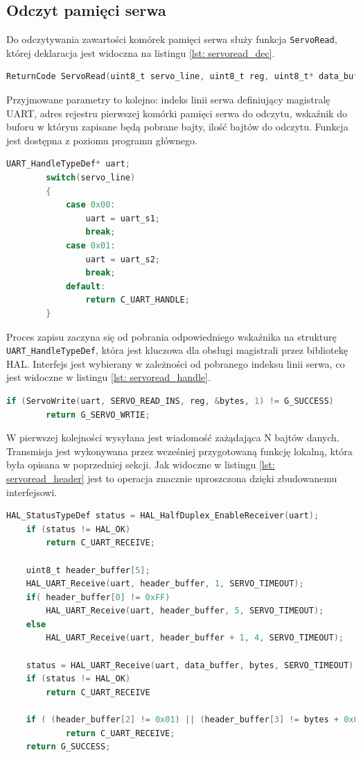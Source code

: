 \subsection{Odczyt pamięci serwa}
Do odczytywania zawartości komórek pamięci serwa służy funkcja \texttt{ServoRead}, której deklaracja jest widoczna na listingu \ref{lst: servoread_dec}.
\begin{lstlisting}[language=C,
caption={Deklaracja funkcji \texttt{ServoRead}},
label={lst: servoread_dec}]
    ReturnCode ServoRead(uint8_t servo_line, uint8_t reg, uint8_t* data_buffer, uint8_t bytes);
\end{lstlisting}
Przyjmowane parametry to kolejno: indeks linii serwa definiujący magistralę UART, adres rejestru pierwszej komórki pamięci serwa do odczytu, wskaźnik do buforu w którym zapisane będą pobrane bajty, ilość bajtów do odczytu. Funkcja jest dostępna z poziomu programu głównego.
\begin{lstlisting}[language=C,
caption={Początek funkcji \texttt{ServoRead}},
label={lst: servoread_handle}]
    UART_HandleTypeDef* uart;
        switch(servo_line)
        {
            case 0x00:
                uart = uart_s1;
                break;
            case 0x01:
                uart = uart_s2;
                break;
            default:
                return C_UART_HANDLE;
        }
\end{lstlisting}
Proces zapisu zaczyna się od pobrania odpowiedniego wskaźnika na strukturę \texttt{UART\_HandleTypeDef}, która jest kluczowa dla obsługi magistrali przez bibliotekę HAL. Interfejs jest wybierany w zależności od pobranego indeksu linii serwa, co jest widoczne w listingu \ref{lst: servoread_handle}.
\begin{lstlisting}[language=C,
caption={Transmisja zażądająca odczytu danych},
label={lst: servoread_header}]
    if (ServoWrite(uart, SERVO_READ_INS, reg, &bytes, 1) != G_SUCCESS)
        return G_SERVO_WRTIE;
\end{lstlisting}
W pierwszej kolejności wysyłana jest wiadomość zażądająca N bajtów danych. Transmisja jest wykonywana przez wcześniej przygotowaną funkcję lokalną, która była opisana w poprzedniej sekcji. Jak widoczne w listingu \ref{lst: servoread_header} jest to operacja znacznie uproszczona dzięki zbudowanemu interfejsowi.
\begin{lstlisting}[language=C,
    caption={Odczyt wiadomości zawierającej dane pobierane z pamięci serwa},
    label={lst: servo_read}]
    HAL_StatusTypeDef status = HAL_HalfDuplex_EnableReceiver(uart);
	if (status != HAL_OK)
		return C_UART_RECEIVE;

	uint8_t header_buffer[5];
	HAL_UART_Receive(uart, header_buffer, 1, SERVO_TIMEOUT);
	if( header_buffer[0] != 0xFF)
		HAL_UART_Receive(uart, header_buffer, 5, SERVO_TIMEOUT);
	else
		HAL_UART_Receive(uart, header_buffer + 1, 4, SERVO_TIMEOUT);

	status = HAL_UART_Receive(uart, data_buffer, bytes, SERVO_TIMEOUT);
	if (status != HAL_OK)
		return C_UART_RECEIVE
        
    if ( (header_buffer[2] != 0x01) || (header_buffer[3] != bytes + 0x02) )
            return C_UART_RECEIVE;
    return G_SUCCESS;
\end{lstlisting}
